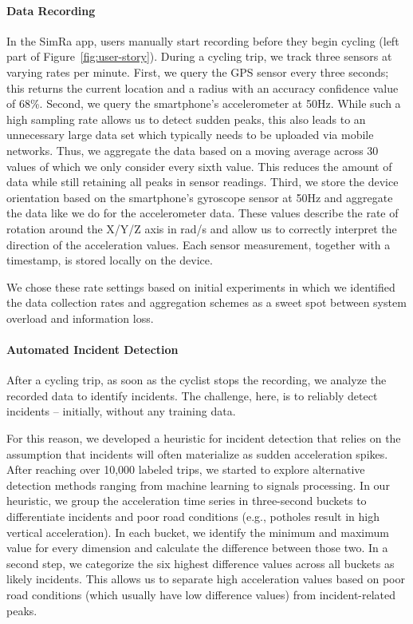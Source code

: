\paragraph{Data Recording}
In the SimRa app, users manually start recording before they begin cycling (left part of Figure~\ref{fig:user-story}).
During a cycling trip, we track three sensors at varying rates per minute.
First, we query the GPS sensor every three seconds; this returns the current location and a radius with an accuracy confidence value of 68\%.
Second, we query the smartphone's accelerometer at 50Hz.
While such a high sampling rate allows us to detect sudden peaks, this also leads to an unnecessary large data set which typically needs to be uploaded via mobile networks.
Thus, we aggregate the data based on a moving average across 30 values of which we only consider every sixth value.
This reduces the amount of data while still retaining all peaks in sensor readings.
Third, we store the device orientation based on the smartphone's gyroscope sensor at 50Hz and aggregate the data like we do for the accelerometer data.
These values describe the rate of rotation around the X/Y/Z axis in rad/s and allow us to correctly interpret the direction of the acceleration values.
Each sensor measurement, together with a timestamp, is stored locally on the device.

We chose these rate settings based on initial experiments in which we identified the data collection rates and aggregation schemes as a sweet spot between system overload and information loss.



\paragraph{Automated Incident Detection}
After a cycling trip, as soon as the cyclist stops the recording, we analyze the recorded data to identify incidents.
The challenge, here, is to reliably detect incidents -- initially, without any training data.

For this reason, we developed a heuristic for incident detection that relies on the assumption that incidents will often materialize as sudden acceleration spikes.
After reaching over 10,000 labeled trips, we started to explore alternative detection methods ranging from machine learning to signals processing.
In our heuristic, we group the acceleration time series in three-second buckets to differentiate incidents and poor road conditions (e.g., potholes result in high vertical acceleration).
In each bucket, we identify the minimum and maximum value for every dimension and calculate the difference between those two.
In a second step, we categorize the six highest difference values across all buckets as likely incidents.
This allows us to separate high acceleration values based on poor road conditions (which usually have low difference values) from incident-related peaks.

